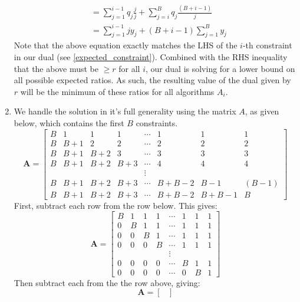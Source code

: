 \documentclass[12pt]{exam}
\begin{document}
\begin{questions}
\begin{solution}
\begin{enumerate}[label=(\alph*)]
\begin{align*}
        &= \sum_{j=1}^{i-1} q_j\frac{j}{j} + \sum_{j=i}^B q_j \frac{(B + i - 1)}{j} \\
        &= \sum_{j=1}^{i-1} jy_j + (B+i - 1)\sum_{j=1}^B y_j
      \end{align*}
      Note that the above equation exactly matches the LHS of the $i$-th constraint in our dual (see \ref{expected_constraint}). Combined with the RHS inequality that the above must be $\geq r$ for all $i$, our dual is solving for a lower bound on all possible expected ratios. As such, the resulting value of the dual given by $r$ will be the minimum of these ratios for all algorithms $A_i$.

    \item
      We handle the solution in it's full generality using the matrix $A$, as given below, which contains the first $B$ constraints.
      \[
        \textbf{A} = 
          \begin{bmatrix}
            B & 1 & 1 & 1 & \cdots & 1 & 1 & 1 \\
            B & B + 1 & 2 & 2 & \cdots & 2 & 2 & 2 \\
            B & B + 1 & B + 2 & 3 & \cdots & 3 & 3 & 3 \\
            B & B + 1 & B + 2 & B + 3 & \cdots & 4 & 4 & 4 \\
            &&&& \vdots &&& \\
            B & B + 1 & B + 2 & B + 3 & \cdots & B+B - 2 & B - 1 & (B-1) \\
            B & B + 1 & B + 2 & B + 3 & \cdots & B+B - 2 & B + B - 1 & B
          \end{bmatrix}
      \]
      First, subtract each row from the row below. This gives:
      \[
        \textbf{A} = 
          \begin{bmatrix}
            B & 1 & 1 & 1 & \cdots & 1 & 1 & 1 \\
            0 & B & 1 & 1 & \cdots & 1 & 1 & 1 \\
            0 & 0 & B & 1 & \cdots & 1 & 1 & 1 \\
            0 & 0 & 0 & B & \cdots & 1 & 1 & 1 \\
            &&&& \vdots &&& \\
            0 & 0 & 0 & 0 & \cdots & B & 1 & 1 \\
            0 & 0 & 0 & 0 & \cdots & 0 & B & 1
          \end{bmatrix}
      \]
      Then subtract each from the the row above, giving:
      \[
        \textbf{A} = 
          \begin{bmatrix}

\end{bmatrix}\]
\end{enumerate}
\end{solution}
\end{questions}
\end{document}
